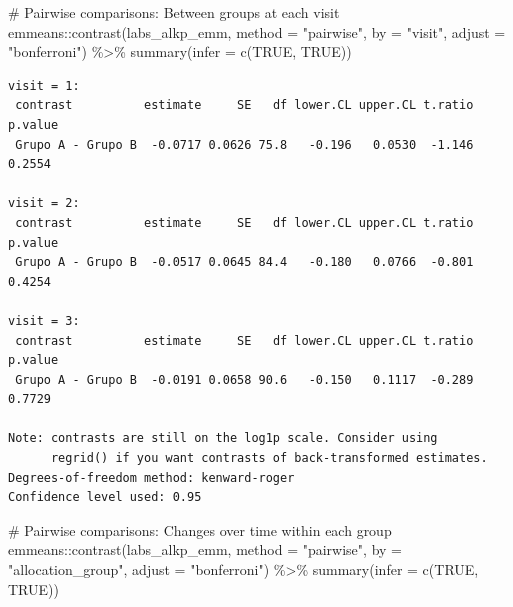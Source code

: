 \documentclass[
  letterpaper,
  DIV=11,
  numbers=noendperiod]{scrartcl}
\newenvironment{Shaded}{\begin{snugshade}}{\end{snugshade}}
\newcommand{\AttributeTok}[1]{\textcolor[rgb]{0.40,0.45,0.13}{#1}}
\newcommand{\CommentTok}[1]{\textcolor[rgb]{0.37,0.37,0.37}{#1}}
\newcommand{\ConstantTok}[1]{\textcolor[rgb]{0.56,0.35,0.01}{#1}}
\newcommand{\FunctionTok}[1]{\textcolor[rgb]{0.28,0.35,0.67}{#1}}
\newcommand{\NormalTok}[1]{\textcolor[rgb]{0.00,0.23,0.31}{#1}}
\newcommand{\SpecialCharTok}[1]{\textcolor[rgb]{0.37,0.37,0.37}{#1}}
\newcommand{\StringTok}[1]{\textcolor[rgb]{0.13,0.47,0.30}{#1}}
\begin{document}
\begin{Shaded}
\begin{Highlighting}[]
\CommentTok{\# Pairwise comparisons: Between groups at each visit}
\NormalTok{emmeans}\SpecialCharTok{::}\FunctionTok{contrast}\NormalTok{(labs\_alkp\_emm, }\AttributeTok{method =} \StringTok{"pairwise"}\NormalTok{, }\AttributeTok{by =} \StringTok{"visit"}\NormalTok{, }\AttributeTok{adjust =} \StringTok{"bonferroni"}\NormalTok{) }\SpecialCharTok{\%\textgreater{}\%} \FunctionTok{summary}\NormalTok{(}\AttributeTok{infer =} \FunctionTok{c}\NormalTok{(}\ConstantTok{TRUE}\NormalTok{, }\ConstantTok{TRUE}\NormalTok{))}
\end{Highlighting}
\end{Shaded}

\begin{verbatim}
visit = 1:
 contrast          estimate     SE   df lower.CL upper.CL t.ratio p.value
 Grupo A - Grupo B  -0.0717 0.0626 75.8   -0.196   0.0530  -1.146  0.2554

visit = 2:
 contrast          estimate     SE   df lower.CL upper.CL t.ratio p.value
 Grupo A - Grupo B  -0.0517 0.0645 84.4   -0.180   0.0766  -0.801  0.4254

visit = 3:
 contrast          estimate     SE   df lower.CL upper.CL t.ratio p.value
 Grupo A - Grupo B  -0.0191 0.0658 90.6   -0.150   0.1117  -0.289  0.7729

Note: contrasts are still on the log1p scale. Consider using
      regrid() if you want contrasts of back-transformed estimates. 
Degrees-of-freedom method: kenward-roger 
Confidence level used: 0.95 
\end{verbatim}

\begin{Shaded}
\begin{Highlighting}[]
\CommentTok{\# Pairwise comparisons: Changes over time within each group}
\NormalTok{emmeans}\SpecialCharTok{::}\FunctionTok{contrast}\NormalTok{(labs\_alkp\_emm, }\AttributeTok{method =} \StringTok{"pairwise"}\NormalTok{, }\AttributeTok{by =} \StringTok{"allocation\_group"}\NormalTok{, }\AttributeTok{adjust =} \StringTok{"bonferroni"}\NormalTok{) }\SpecialCharTok{\%\textgreater{}\%} \FunctionTok{summary}\NormalTok{(}\AttributeTok{infer =} \FunctionTok{c}\NormalTok{(}\ConstantTok{TRUE}\NormalTok{, }\ConstantTok{TRUE}\NormalTok{))}
\end{Highlighting}
\end{Shaded}
\end{document}
